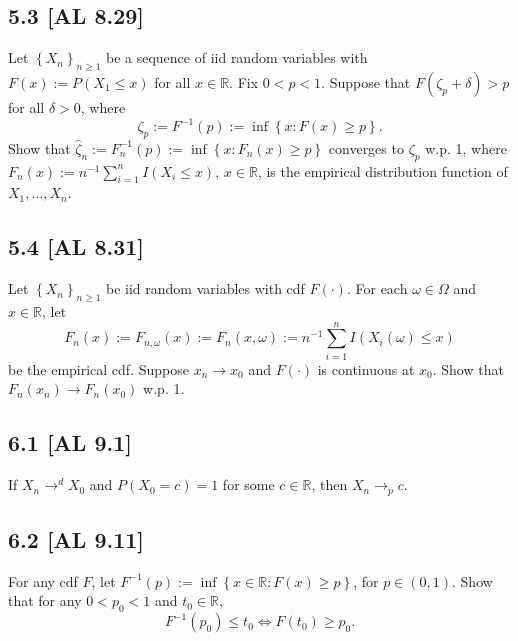 \documentclass[12pt]{article}
\begin{document}
\newpage
\subsection*{5.3 [AL 8.29]}
\begin{tcolorbox}
Let $\left\{ X_{n} \right\}_{n\geq 1}$ be a sequence of iid random variables with $F(x) := P(X_{1} \leq x)$ for all $x \in \mathbb{R}$. Fix $0 < p <
1$. Suppose that $F(\zeta_{p} + \delta) > p$ for all $\delta> 0$, where 
\[ \zeta_p := F^{-1}(p) := \inf\left\{ x : F(x) \geq p \right\}. \]
Show that $\hat{\zeta}_{n} := F_{n}^{-1}(p) := \inf\left\{ x : F_{n}(x) \geq p \right\}$ converges to $\zeta_{p}$ w.p. 1, where $F_{n}(x) :=
n^{-1}\sum_{i=1}^{n}I(X_{i} \leq x)$, $x \in \mathbb{R}$, is the empirical distribution function of $X_{1}, \hdots, X_{n}$.
\end{tcolorbox}


\subsection*{5.4 [AL 8.31]}
\begin{tcolorbox}
Let $\left\{ X_{n} \right\}_{n\geq 1}$ be iid random variables with cdf $F(\cdot)$. For each $\omega \in \Omega$ and $x \in \mathbb{R}$, let
\[ F_{n}(x) := F_{n,\omega}(x) := F_{n}(x,\omega) := n^{-1}\sum_{i=1}^{n}I(X_{i}(\omega)\leq x) \]
be the empirical cdf. Suppose $x_{n} \rightarrow x_{0}$ and $F(\cdot)$ is continuous at $x_{0}$. Show that $F_{n}(x_{n}) \rightarrow
F_{n}(x_{0})$ w.p. 1.
\end{tcolorbox}



\subsection*{6.1 [AL 9.1]}
\begin{tcolorbox}
If $X_{n}\rightarrow^{d}X_{0}$ and $P(X_0 = c) = 1$ for some $c \in \mathbb{R}$, then $X_n \rightarrow_p c$.
\end{tcolorbox}



\subsection*{6.2 [AL 9.11]}
\begin{tcolorbox}
For any cdf $F$, let $F^{-1}(p) := \inf\left\{ x \in \mathbb{R} : F(x) \geq p \right\}$, for $p \in (0,1)$. Show that for any $0 < p_{0} < 1$ and
$t_{0} \in \mathbb{R}$,
\[ F^{-1}(p_{0}) \leq t_{0} \Leftrightarrow F(t_{0}) \geq p_{0}. \]
\end{tcolorbox}
\end{document}
